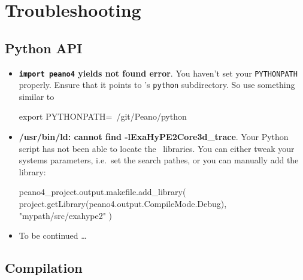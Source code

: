 \chapter{Troubleshooting}


\section{Python API}

\begin{itemize}
  \item \textbf{\texttt{import peano4} yields not found error}. You haven't set
  your \texttt{PYTHONPATH} properly. Ensure that it points to \Peano's
  \texttt{python} subdirectory. So use something similar to 
  \begin{code}
export PYTHONPATH=~/git/Peano/python
  \end{code}
  \item \textbf{/usr/bin/ld: cannot find -lExaHyPE2Core3d\_trace}. Your Python
  script has not been able to locate the \Peano\ libraries. You can either tweak
  your systems parameters, i.e.~set the search pathes, or you can manually add
  the library:
\begin{code}
peano4_project.output.makefile.add_library(
  project.getLibrary(peano4.output.CompileMode.Debug), 
  "mypath/src/exahype2" 
)
\end{code}
  \item To be continued \dots
\end{itemize}


\section{Compilation}





